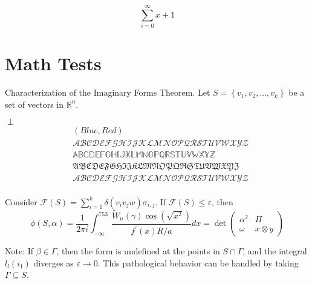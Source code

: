 \[\sum_{i=0}^{\infty} x + 1\]


\section{Math Tests}

Characterization of the Imaginary Forms
Theorem.
Let $S=\left\{v_1, v_2, \ldots, v_k\right\}$ be a set of vectors in $\mathbb{R}^n$.


\begin{center}
    $\perp$ 
    \begin{equation}
        \begin{split}
        &(\mathit{Blue}, \mathit{Red})\\
        &\mathcal{ABCDEFGHIJKLMNOPQRSTUVWXYZ}\\
        &\mathbb{ABCDEFGHIJKLMNOPQRSTUVWXYZ}\\
        &\mathfrak{ABCDEFGHIJKLMNOPQRSTUVWXYZ}\\
        &\mathscr{ABCDEFGHIJKLMNOPQRSTUVWXYZ}\\
        \end{split}
    \end{equation}
\end{center}
Consider $\mathcal{F}(S)=\sum_{i=1}^k \delta\left(v_i v_j w\right) \sigma_{i, j}$.
If $\mathcal{F}(S) \leq \varepsilon$, then
$$
\phi(S, \alpha)=\frac{1}{2 \pi i} \int_{-\infty}^{753} \frac{\tilde{W}_n(\gamma) \cos \left(\sqrt{x^2}\right)}{f^{\prime}(x) R / a} d x=\operatorname{det}\left(\begin{array}{cc}
\alpha^2 & \Pi \\
\omega & x \otimes y
\end{array}\right)
$$


Note: If $\beta \in \Gamma$, then the form is undefined at the points in $S \cap \Gamma$, and the integral $l_l\left(i_1\right)$ diverges as $\varepsilon \rightarrow 0$. This pathological behavior can be handled by taking $\Gamma \subseteq S$.

